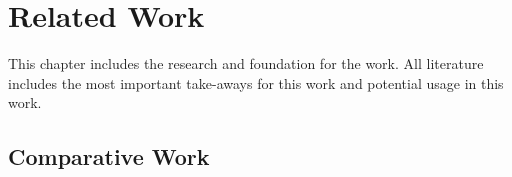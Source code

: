 \chapter{Related Work}
\label{cha:literature}


	This chapter includes the research and foundation for the work. All literature includes the most important take-aways for this work and potential usage in this work.\\


	\section{Comparative Work}
	\label{sec:lit-core}
		
